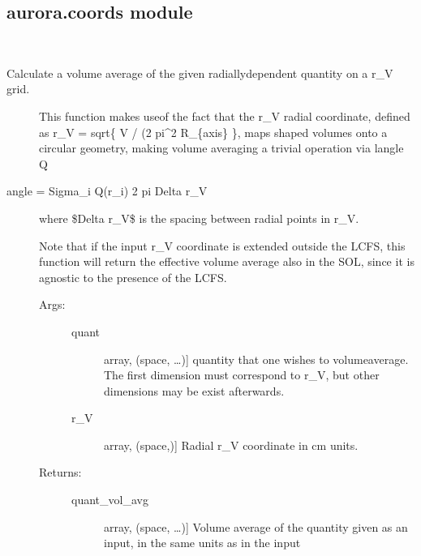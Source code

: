 \documentclass[letterpaper,10pt,english]{sphinxmanual}
\begin{document}
\subsection{aurora.coords module}
\label{\detokenize{aurora:module-aurora.coords}}\label{\detokenize{aurora:aurora-coords-module}}

\begin{fulllineitems}
\label{\detokenize{aurora:aurora.coords.rV_vol_average}}~\begin{description}
\item[{Calculate a volume average of the given radially\sphinxhyphen{}dependent quantity on a r\_V grid.}] \leavevmode
This function makes useof the fact that the r\_V radial coordinate, defined as 
r\_V = sqrt\{ V / (2 pi\textasciicircum{}2 R\_\{axis\} \},
maps shaped volumes onto a circular geometry, making volume averaging a trivial 
operation via
langle Q

\item[{angle = Sigma\_i Q(r\_i) 2 pi Delta r\_V}] \leavevmode
where \$Delta r\_V\$ is the spacing between radial points in r\_V.

Note that if the input r\_V coordinate is extended outside the LCFS,
this function will return the effective volume average also in the SOL, since it is 
agnostic to the presence of the LCFS.
\begin{description}
\item[{Args:}] \leavevmode\begin{description}
\item[{quant}] \leavevmode{[}array, (space, …){]}
quantity that one wishes to volume\sphinxhyphen{}average. The first dimension must correspond to r\_V,
but other dimensions may be exist afterwards.

\item[{r\_V}] \leavevmode{[}array, (space,){]}
Radial r\_V coordinate in cm units.

\end{description}

\item[{Returns:}] \leavevmode\begin{description}
\item[{quant\_vol\_avg}] \leavevmode{[}array, (space, …){]}
Volume average of the quantity given as an input, in the same units as in the input

\end{description}

\end{description}

\end{description}

\end{fulllineitems}
\end{document}
